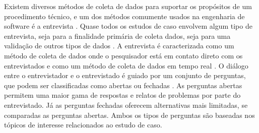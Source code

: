 Existem diversos métodos de coleta de dados para suportar os propósitos de um procedimento técnico, e um dos métodos comumente usados na engenharia de software é a entrevista \cite{caseStudySE}. Quase todos os estudos de caso envolvem algum tipo de entrevista, seja para a finalidade primária de coleta dados, seja para uma validação de outros tipos de dados \cite{caseStudySE}. A entrevista é caracterizada como um método de coleta de dados onde o pesquisador está em contato direto com os entrevistados e como um método de coleta de dados em tempo real \cite{caseStudySE}. O diálogo entre o entrevistador e o entrevistado é guiado por um conjunto de perguntas, que podem ser classificadas como abertas ou fechadas \cite{caseStudySE}. As perguntas abertas permitem uma maior gama de respostas e relatos de problemas por parte do entrevistado. Já as perguntas fechadas oferecem alternativas mais limitadas, se comparadas as perguntas abertas. Ambos os tipos de perguntas são baseadas nos tópicos de interesse relacionados ao estudo de caso.

